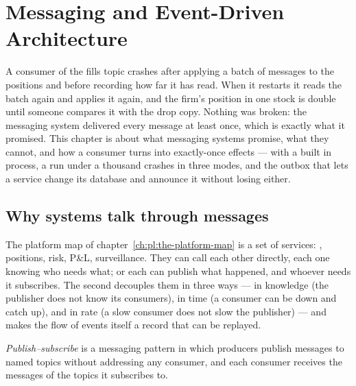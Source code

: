 \chapter{Messaging and Event-Driven Architecture}\label{ch:pl:messaging-and-event-driven-architecture}

A consumer of the fills topic crashes after applying a batch of messages to the positions and before recording how far it has read. When it
restarts it reads the batch again and applies it again, and the firm's position in one stock is double until someone compares it with the
drop copy. Nothing was broken: the messaging system delivered every message at least once, which is exactly what it promised. This chapter
is about what messaging systems promise, what they cannot, and how a consumer turns  into exactly-once effects --- with a
 built in process, a  run under a thousand crashes in three modes, and the outbox that lets a service change
its database and announce it without losing either.

\section{Why systems talk through messages}

The platform map of chapter~\ref{ch:pl:the-platform-map} is a set of services: , positions, risk, P\&L, surveillance. They can
call each other directly, each one knowing who needs what; or each can publish what happened, and whoever needs it subscribes. The second
decouples them in three ways --- in knowledge (the publisher does not know its consumers), in time (a consumer can be down and catch up), and
in rate (a slow consumer does not slow the publisher) --- and makes the flow of events itself a record that can be replayed.

\begin{definition}\label{def:pl:messaging-and-event-driven-architecture:pubsub}
\emph{Publish--subscribe} is a messaging pattern in which producers publish messages to named topics without
addressing any consumer, and each consumer receives the messages of the topics it subscribes to.
\end{definition}

